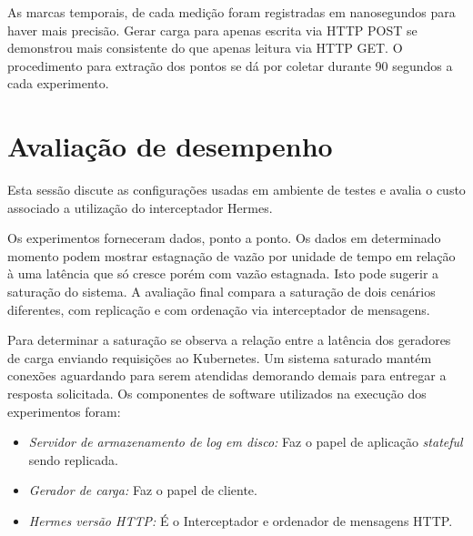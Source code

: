 As marcas temporais, de cada medição foram registradas em nanosegundos para haver mais precisão. Gerar carga para apenas escrita via \gls{HTTP} POST se demonstrou mais consistente do que apenas leitura via \gls{HTTP} GET. O procedimento para extração dos pontos se dá por coletar durante 90 segundos a cada experimento.

\section{Avaliação de desempenho}

Esta sessão discute as configurações usadas em ambiente de testes e avalia o custo associado a utilização do interceptador Hermes.

Os experimentos forneceram dados, ponto a ponto. Os dados em determinado momento podem mostrar estagnação de vazão por unidade de tempo em relação à uma latência que só cresce porém com vazão estagnada. Isto pode sugerir a saturação do sistema. A avaliação final compara a saturação de dois cenários diferentes, com replicação e com ordenação via interceptador de mensagens.

Para determinar a saturação se observa a relação entre a latência dos geradores de carga enviando requisições ao Kubernetes. Um sistema saturado mantém conexões aguardando para serem atendidas demorando demais para entregar a resposta solicitada. Os componentes de software utilizados na execução dos experimentos foram:

\begin{itemize}
\item \textit{Servidor de armazenamento de log em disco:} Faz o papel de aplicação \textit{stateful} sendo replicada.

\item \textit{Gerador de carga:} Faz o papel de cliente.

\item \textit{Hermes versão HTTP:} É o Interceptador e ordenador de mensagens HTTP.
\end{itemize}

